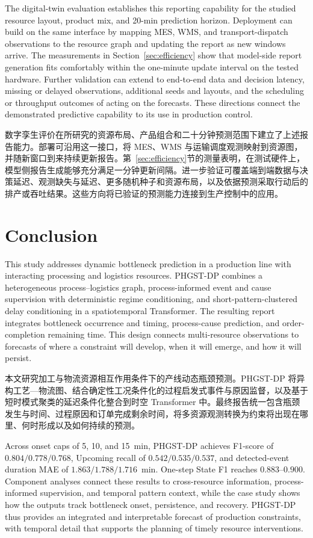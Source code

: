 \documentclass[a4paper,fleqn]{cas-dc}
\newcommand{\zhpara}[1]{%
  \par\begingroup\small\color{black!72}\noindent #1\par\endgroup}
\begin{document}
The digital-twin evaluation establishes this reporting capability for the studied resource layout, product mix, and 20-min prediction horizon. Deployment can build on the same interface by mapping MES, WMS, and transport-dispatch observations to the resource graph and updating the report as new windows arrive. The measurements in Section~\ref{sec:efficiency} show that model-side report generation fits comfortably within the one-minute update interval on the tested hardware. Further validation can extend to end-to-end data and decision latency, missing or delayed observations, additional seeds and layouts, and the scheduling or throughput outcomes of acting on the forecasts. These directions connect the demonstrated predictive capability to its use in production control.

\zhpara{数字孪生评价在所研究的资源布局、产品组合和二十分钟预测范围下建立了上述报告能力。部署可沿用这一接口，将 MES、WMS 与运输调度观测映射到资源图，并随新窗口到来持续更新报告。第~\ref{sec:efficiency}节的测量表明，在测试硬件上，模型侧报告生成能够充分满足一分钟更新间隔。进一步验证可覆盖端到端数据与决策延迟、观测缺失与延迟、更多随机种子和资源布局，以及依据预测采取行动后的排产或吞吐结果。这些方向将已验证的预测能力连接到生产控制中的应用。}

\section{Conclusion}\label{sec:conclusion}

This study addresses dynamic bottleneck prediction in a production line with interacting processing and logistics resources. PHGST-DP combines a heterogeneous process--logistics graph, process-informed event and cause supervision with deterministic regime conditioning, and short-pattern-clustered delay conditioning in a spatiotemporal Transformer. The resulting report integrates bottleneck occurrence and timing, process-cause prediction, and order-completion remaining time. This design connects multi-resource observations to forecasts of where a constraint will develop, when it will emerge, and how it will persist.

\zhpara{本文研究加工与物流资源相互作用条件下的产线动态瓶颈预测。PHGST-DP 将异构工艺—物流图、结合确定性工况条件化的过程启发式事件与原因监督，以及基于短时模式聚类的延迟条件化整合到时空 Transformer 中。最终报告统一包含瓶颈发生与时间、过程原因和订单完成剩余时间，将多资源观测转换为约束将出现在哪里、何时形成以及如何持续的预测。}

Across onset caps of 5, 10, and 15~min, PHGST-DP achieves F1-score of $0.804/0.778/0.768$, Upcoming recall of $0.542/0.535/0.537$, and detected-event duration MAE of $1.863/1.788/1.716$~min. One-step State F1 reaches $0.883$--$0.900$. Component analyses connect these results to cross-resource information, process-informed supervision, and temporal pattern context, while the case study shows how the outputs track bottleneck onset, persistence, and recovery. PHGST-DP thus provides an integrated and interpretable forecast of production constraints, with temporal detail that supports the planning of timely resource interventions.
\end{document}

